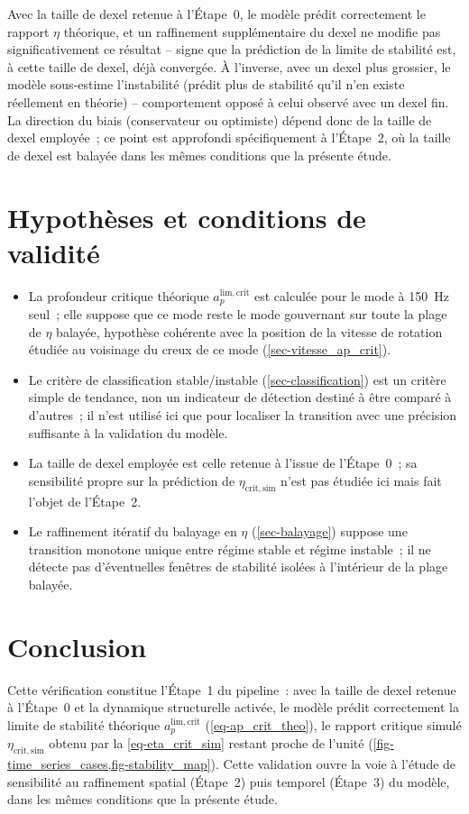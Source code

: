\documentclass[
    11pt,
    a4paper
]{article}
\newcommand{\apcrit}{a_p^{\mathrm{lim,crit}}}
\newcommand{\etasim}{\eta_{\mathrm{crit,sim}}}
\begin{document}
Avec la taille de dexel retenue à l'Étape~0, le modèle prédit correctement le
rapport \(\eta\) théorique, et un raffinement supplémentaire du dexel ne
modifie pas significativement ce résultat -- signe que la prédiction de la
limite de stabilité est, à cette taille de dexel, déjà convergée. À
l'inverse, avec un dexel plus grossier, le modèle sous-estime l'instabilité
(prédit plus de stabilité qu'il n'en existe réellement en théorie) --
comportement opposé à celui observé avec un dexel fin. La direction du biais
(conservateur ou optimiste) dépend donc de la taille de dexel employée~; ce
point est approfondi spécifiquement à l'Étape~2, où la taille de dexel est
balayée dans les mêmes conditions que la présente étude.

\section{Hypothèses et conditions de validité}
\label{sec-hypotheses}

\begin{itemize}
    \item La profondeur critique théorique \(\apcrit\) est calculée pour le
        mode à \SI{150}{Hz} seul~; elle suppose que ce mode reste le mode
        gouvernant sur toute la plage de \(\eta\) balayée, hypothèse
        cohérente avec la position de la vitesse de rotation étudiée au
        voisinage du creux de ce mode (\cref{sec-vitesse_ap_crit}).
    \item Le critère de classification stable/instable
        (\cref{sec-classification}) est un critère simple de tendance, non
        un indicateur de détection destiné à être comparé à d'autres~; il
        n'est utilisé ici que pour localiser la transition avec une
        précision suffisante à la validation du modèle.
    \item La taille de dexel employée est celle retenue à l'issue de
        l'Étape~0~; sa sensibilité propre sur la prédiction de \(\etasim\)
        n'est pas étudiée ici mais fait l'objet de l'Étape~2.
    \item Le raffinement itératif du balayage en \(\eta\)
        (\cref{sec-balayage}) suppose une transition monotone unique entre
        régime stable et régime instable~; il ne détecte pas d'éventuelles
        fenêtres de stabilité isolées à l'intérieur de la plage balayée.
\end{itemize}

\section{Conclusion}
\label{sec-conclusion}

Cette vérification constitue l'Étape~1 du pipeline~: avec la taille de dexel
retenue à l'Étape~0 et la dynamique structurelle activée, le modèle prédit
correctement la limite de stabilité théorique \(\apcrit\)
(\cref{eq-ap_crit_theo}), le rapport critique simulé \(\etasim\) obtenu par
la \cref{eq-eta_crit_sim} restant proche de l'unité
(\cref{fig-time_series_cases,fig-stability_map}). Cette validation ouvre la
voie à l'étude de sensibilité au raffinement spatial (Étape~2) puis temporel
(Étape~3) du modèle, dans les mêmes conditions que la présente étude.

\end{document}
